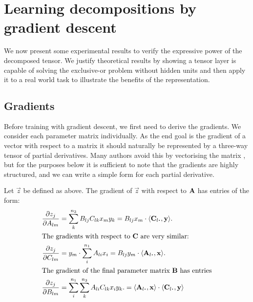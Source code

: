 \section{Learning decompositions by gradient descent}
We now present some experimental results 
to verify the expressive power of the decomposed tensor. We justify theoretical
results by showing a tensor layer is capable of solving the exclusive-or problem without hidden units
and then apply it to a real world task to illustrate the benefits of the representation.

\subsection{Gradients}
Before training with gradient descent, we first need to derive the gradients. 
We consider each parameter matrix individually.
As the end goal is the gradient of a vector with respect
to a matrix it should naturally be represented by a three-way tensor of partial derivatives.
Many authors avoid this by
vectorising the matrix \autocite{Magnus2007}, but for the purposes below it is sufficient to note
that the gradients are highly structured, and we can write a simple form for each partial derivative.

Let \(\vec{z}\) be defined as above.
The gradient of \(\vec{z}\) with respect to \(\mathbf{A}\) has entries of the form:
\begin{align}
	\frac{\partial z_j}{\partial A_{lm}} &= \sum_k^{n_3}B_{lj}C_{lk}x_my_k 
		= B_{lj}x_m \cdot \langle\vec{C}_{l\midbullet}, \vec{y}\rangle.\\
\intertext{The gradients with respect to \(\mat{C}\) are very similar:}
	\frac{\partial z_j}{\partial C_{lm}} &= y_m \cdot \sum_i^{n_1}A_{li}x_i 
		= B_{lj}y_m \cdot \langle\vec{A}_{l\midbullet}, \vec{x}\rangle.\\
\intertext{The gradient of the final parameter matrix \(\mat{B}\) has entries}
	\frac{\partial z_j}{\partial B_{lm}} &= 
		\sum_i^{n_1}\sum_k^{n_3}A_{li}C_{lk}x_iy_k. 
		= \langle\vec{A}_{l\midbullet}, \vec{x}\rangle \cdot 
		\langle\vec{C}_{l\midbullet}, \vec{y}\rangle
		\label{eq:cpbilingrad}
\end{align}

